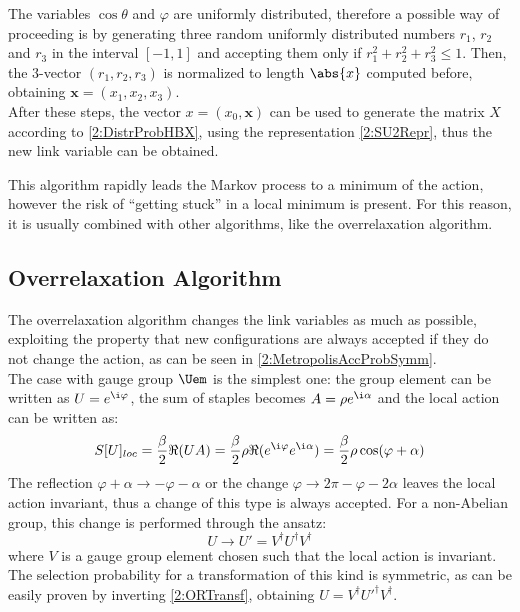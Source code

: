 The variables $\cos\theta$ and $\varphi$ are uniformly distributed, therefore a possible way of proceeding is by generating three random uniformly distributed numbers $r_1$, $r_2$ and $r_3$ in the interval $[-1,1]$ and accepting them only if $r_1^2+r_2^2+r_3^2\leq1$.
Then, the $3$-vector $(r_1,r_2,r_3)$ is normalized to length $\abs{x}$ computed before, obtaining $\bm{x} = (x_1,x_2,x_3)$.\\
After these steps, the vector $x=(x_0,\bm{x})$ can be used to generate the matrix $X$ according to \eqref{2:DistrProbHBX}, using the representation \eqref{2:SU2Repr}, thus the new link variable can be obtained.

This algorithm rapidly leads the Markov process to a minimum of the action, however the risk of ``getting stuck'' in a local minimum is present.
For this reason, it is usually combined with other algorithms, like the overrelaxation algorithm.

\subsection{Overrelaxation Algorithm}
The overrelaxation algorithm changes the link variables as much as possible, exploiting the property that new configurations are always accepted if they do not change the action, as can be seen in \eqref{2:MetropolisAccProbSymm}.\\
The case with gauge group $\Uem$ is the simplest one: the group element can be written as $U=e^{\i\varphi}$, the sum of staples becomes $A=\rho e^{\i\alpha}$ and the local action can be written as:
\begin{equation}
    S[U]_{loc} = \frac\beta2 \Re(UA) = \frac\beta2 \rho \Re(e^{\i\varphi}e^{\i\alpha}) = \frac\beta2\rho\cos(\varphi+\alpha) \label{2:SlocORU1}  
\end{equation}
The reflection $\varphi+\alpha\to-\varphi-\alpha$ or the change $\varphi\to2\pi-\varphi-2\alpha$ leaves the local action invariant, thus a change of this type is always accepted.
For a non-Abelian group, this change is performed through the ansatz:
\begin{equation}
    U \to U' = V^\dagger U^\dagger V^\dagger \label{2:ORTransf}
\end{equation}
where $V$ is a gauge group element chosen such that the local action is invariant.
The selection probability for a transformation of this kind is symmetric, as can be easily proven by inverting \eqref{2:ORTransf}, obtaining $U = V^\dagger U'^\dagger V^\dagger$.

